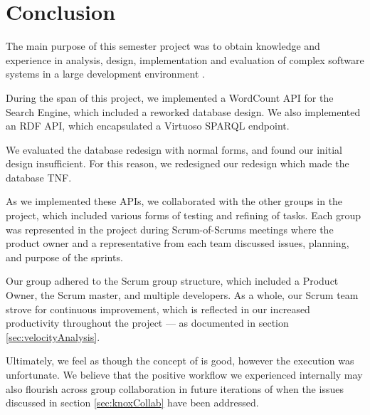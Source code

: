 \chapter{Conclusion}\label{ch:conclusion}
The main purpose of this semester project was to obtain knowledge and experience in analysis, design, implementation and evaluation of complex software systems in a large development environment \cite{AAULearningGoals5thSemester}.

During the span of this project, we implemented a WordCount API for the \knox{} Search Engine, which included a reworked database design. We also implemented an RDF API, which encapsulated a Virtuoso SPARQL endpoint.

We evaluated the database redesign with normal forms, and found our initial design insufficient. For this reason, we redesigned our redesign which made the database TNF.

As we implemented these APIs, we collaborated with the other groups in the project, which included various forms of testing and refining of tasks. Each group was represented in the project during Scrum-of-Scrums meetings where the \knox{} product owner and a representative from each team discussed issues, planning, and purpose of the sprints.

Our group adhered to the Scrum group structure, which included a Product Owner, the Scrum master, and multiple developers.
As a whole, our Scrum team strove for continuous improvement, which is reflected in our increased productivity throughout the project --- as documented in section \ref{sec:velocityAnalysis}.

Ultimately, we feel as though the concept of \knox{} is good, however the execution was unfortunate.
We believe that the positive workflow we experienced internally may also flourish across group collaboration in future iterations of \knox{} when the issues discussed in section \ref{sec:knoxCollab} have been addressed.